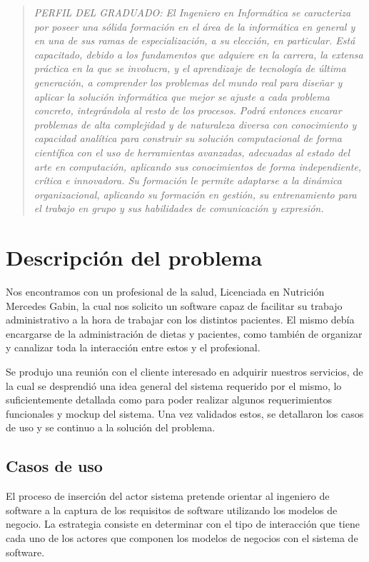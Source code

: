 \documentclass[runningheads,a4paper,spanish]{llncs}
\begin{document}
\begin{quotation}
	\textit{PERFIL DEL GRADUADO: El Ingeniero en Informática se caracteriza por poseer una sólida formación en el área
	de la informática en general y en una de sus ramas de especialización, a su elección,
	en particular. Está capacitado, debido a los fundamentos que adquiere en la carrera,
	la extensa práctica en la que se involucra, y el aprendizaje de tecnología de última
	generación, a comprender los problemas del mundo real para diseñar y aplicar la
	solución informática que mejor se ajuste a cada problema concreto, integrándola al
	resto de los procesos. Podrá entonces encarar problemas de alta complejidad y de
	naturaleza diversa con conocimiento y capacidad analítica para construir su solución
	computacional de forma científica con el uso de herramientas avanzadas, adecuadas
	al estado del arte en computación, aplicando sus conocimientos de forma independiente,
	crítica e innovadora. Su formación le permite adaptarse a la dinámica organizacional,
	aplicando su formación en gestión, su entrenamiento para el trabajo en
	grupo y sus habilidades de comunicación y expresión.}\cite{carrera}
\end{quotation}


\section{Descripción del problema}
Nos encontramos con un profesional de la salud, Licenciada en Nutrición Mercedes Gabin, la cual nos solicito un software capaz de facilitar su trabajo administrativo a la hora de trabajar con los distintos pacientes. El mismo debía encargarse de la administración de dietas y pacientes, como también de organizar y canalizar toda la interacción entre estos y el profesional. 

Se produjo una reunión con el cliente interesado en adquirir nuestros servicios, de la cual se desprendió una idea general del sistema requerido por el mismo, lo suficientemente detallada como para poder realizar algunos requerimientos funcionales y mockup del sistema. Una vez validados estos, se detallaron los casos de uso y se continuo a la solución del problema.

\subsection{Casos de uso}
El proceso de inserción del actor sistema pretende orientar al ingeniero de software a la captura de los requisitos de software utilizando los modelos de negocio. La estrategia consiste en determinar con el tipo de interacción que tiene cada uno de los actores que componen los modelos de negocios con el sistema de software.\cite{estrada}
\end{document}
